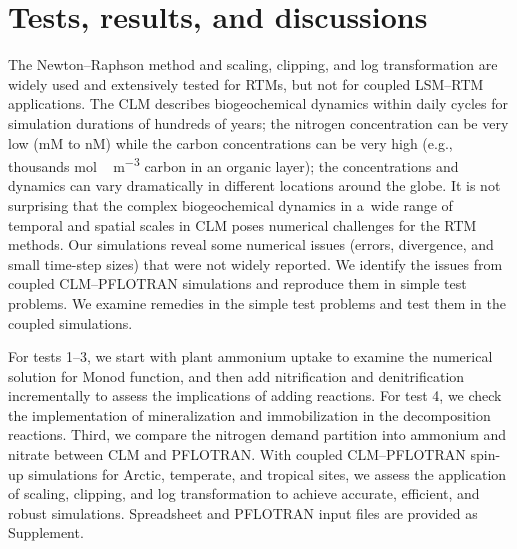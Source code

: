 \documentclass[gmd,noline]{copernicus}
\begin{document}
\section{Tests, results, and discussions}%

      The Newton--Raphson method and scaling, clipping, and log
      transformation are widely used and extensively tested for RTMs, but
      not for coupled LSM--RTM applications. The CLM describes biogeochemical
      dynamics within daily cycles for simulation durations of hundreds of
      years; the nitrogen concentration can be very low (\unit{mM} to
      \unit{nM}) while the carbon concentrations can be very high (e.g.,
      thousands \unit{mol\,m^{-3}} carbon in an organic layer); the
      concentrations and dynamics can vary dramatically in different
      locations around the globe. It is not surprising that the complex
      biogeochemical dynamics in a~wide range of temporal and spatial scales
      in CLM poses numerical challenges for the RTM methods. Our simulations
      reveal some numerical issues (errors, divergence, and small time-step
      sizes) that were not widely reported. We identify the issues from
      coupled CLM--PFLOTRAN simulations and reproduce them in simple test
      problems. We examine remedies in the simple test problems and test
      them in the coupled simulations.

      For tests 1--3, we start with plant ammonium uptake to examine the
      numerical solution for Monod function, and then add nitrification and
      denitrification incrementally to assess the implications of adding
      reactions. For test 4, we check the implementation of mineralization
      and immobilization in the decomposition reactions. Third, we compare
      the nitrogen demand partition into ammonium and nitrate between CLM
      and PFLOTRAN. With coupled CLM--PFLOTRAN spin-up simulations for
      Arctic, temperate, and tropical sites, we assess the application of
      scaling, clipping, and log transformation to achieve accurate,
      efficient, and robust simulations. Spreadsheet and PFLOTRAN input
      files are provided as Supplement.
\end{document}
